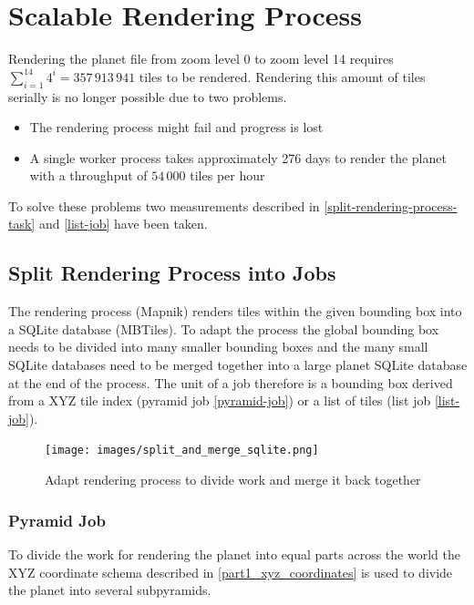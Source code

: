 \chapter{Scalable Rendering Process}\label{chapter_scalable_rendering_process}



Rendering the planet file from zoom level 0 to zoom level 14 requires $\sum_{i=1}^{14} 4^i = 357\,913\,941$ tiles to be rendered. 
Rendering this amount of tiles serially is no longer possible due to two problems.

\begin{itemize}
    \item The rendering process might fail and progress is lost
    \item A single worker process takes approximately 276 days to render the planet with a throughput of $54\,000$ tiles per hour
\end{itemize}

To solve these problems two measurements described in \autoref{split-rendering-process-task} and \autoref{list-job} have been taken.

\section{Split Rendering Process into Jobs}\label{split-rendering-process-task}

The rendering process (Mapnik)
renders tiles within the given bounding box into a SQLite database (MBTiles). To adapt the process the global bounding box needs to be divided into many smaller bounding boxes and the many small SQLite databases need to be merged together into a large planet SQLite database at the end of the process.
The unit of a job therefore is a bounding box derived from a XYZ tile index (pyramid job \autoref{pyramid-job}) or a list of tiles (list job \autoref{list-job}).

\begin{figure}[H]
  \centering
  \texttt{[image: images/split\_and\_merge\_sqlite.png]}
  \caption{Adapt rendering process to divide work and merge it back together}
\end{figure}

\subsection{Pyramid Job}\label{pyramid-job}

To divide the work for rendering the planet into equal parts across the world the XYZ coordinate schema described in \autoref{part1_xyz_coordinates} is used to divide the planet into several subpyramids.

